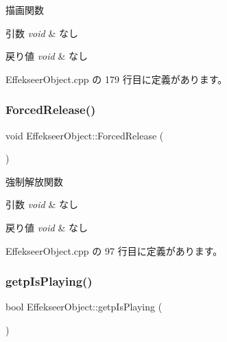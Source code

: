 描画関数 


\begin{DoxyParams}{引数}
{\em void} & なし \\
\hline
\end{DoxyParams}

\begin{DoxyRetVals}{戻り値}
{\em void} & なし \\
\hline
\end{DoxyRetVals}


 Effekseer\+Object.\+cpp の 179 行目に定義があります。

\mbox{\label{class_effekseer_object_a59e36b36fbd554807987b55495250dd2}} 
\subsubsection{\texorpdfstring{Forced\+Release()}{ForcedRelease()}}
{\footnotesize\ttfamily void Effekseer\+Object\+::\+Forced\+Release (\begin{DoxyParamCaption}{ }\end{DoxyParamCaption})}



強制解放関数 


\begin{DoxyParams}{引数}
{\em void} & なし \\
\hline
\end{DoxyParams}

\begin{DoxyRetVals}{戻り値}
{\em void} & なし \\
\hline
\end{DoxyRetVals}


 Effekseer\+Object.\+cpp の 97 行目に定義があります。

\mbox{\label{class_effekseer_object_a2c09306dca9956b1f2518f10a10dd698}} 
\subsubsection{\texorpdfstring{getp\+Is\+Playing()}{getpIsPlaying()}}
{\footnotesize\ttfamily bool Effekseer\+Object\+::getp\+Is\+Playing (\begin{DoxyParamCaption}{ }\end{DoxyParamCaption})}



